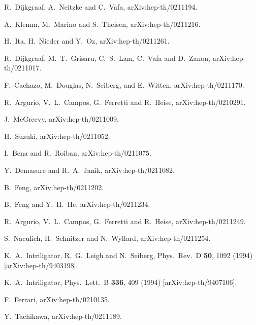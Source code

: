 \documentclass[a4paper,12pt]{article}
\begin{document}
\begin{thebibliography}{99}
R.~Dijkgraaf, A.~Neitzke and C.~Vafa,
arXiv:hep-th/0211194.

A.~Klemm, M.~Marino and S.~Theisen,
arXiv:hep-th/0211216.

H.~Ita, H.~Nieder and Y.~Oz,
arXiv:hep-th/0211261.



R.~Dijkgraaf, M.~T.~Grisaru, C.~S.~Lam, C.~Vafa and D.~Zanon,
arXiv:hep-th/0211017.

F.~Cachazo, M.~Douglas, N.~Seiberg, and E.~Witten,
arXiv:hep-th/0211170.



R.~Argurio, V.~L.~Campos, G.~Ferretti and R.~Heise,
arXiv:hep-th/0210291.

J.~McGreevy,
arXiv:hep-th/0211009.

H.~Suzuki,
arXiv:hep-th/0211052.

I.~Bena and R.~Roiban,
arXiv:hep-th/0211075.

Y.~Demasure and R.~A.~Janik,
arXiv:hep-th/0211082.

B.~Feng,
arXiv:hep-th/0211202.

B.~Feng and Y.~H.~He,
arXiv:hep-th/0211234.

R.~Argurio, V.~L.~Campos, G.~Ferretti and R.~Heise,
arXiv:hep-th/0211249.

S.~Naculich, H.~Schnitzer and N.~Wyllard,
arXiv:hep-th/0211254.


K.~A.~Intriligator, R.~G.~Leigh and N.~Seiberg,
Phys.\ Rev.\ D {\bf 50}, 1092 (1994)
[arXiv:hep-th/9403198].

K.~A.~Intriligator,
Phys.\ Lett.\ B {\bf 336}, 409 (1994)
[arXiv:hep-th/9407106].

F.~Ferrari,
arXiv:hep-th/0210135.

Y.~Tachikawa,
arXiv:hep-th/0211189.



\end{thebibliography}
\end{document}
